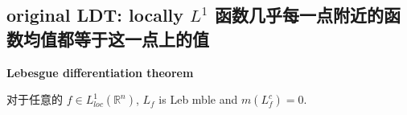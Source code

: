 \documentclass{qlnotes-export}
\begin{document}
\subsection{\texorpdfstring{original LDT: locally \(L^{1}\) 函数几乎每一点附近的函数均值都等于这一点上的值}{original LDT: locally L\^{}\{1\} 函数几乎每一点附近的函数均值都等于这一点上的值}}\label{original-ldt-locally-l1-ux51fdux6570ux51e0ux4e4eux6bcfux4e00ux70b9ux9644ux8fd1ux7684ux51fdux6570ux5747ux503cux90fdux7b49ux4e8eux8fd9ux4e00ux70b9ux4e0aux7684ux503c}

\begin{theorem}{\protect{}\label{kn-lebesgue-differentiation-theorem}{\textbf{Lebesgue
differentiation theorem}}}

对于任意的 \(f \in L_{loc}^{1}({\mathbb{R}}^{n})\), \(L_{f}\) is Leb mble and \(m(L_{f}^{c}) = 0\).

\end{theorem}
\end{document}

